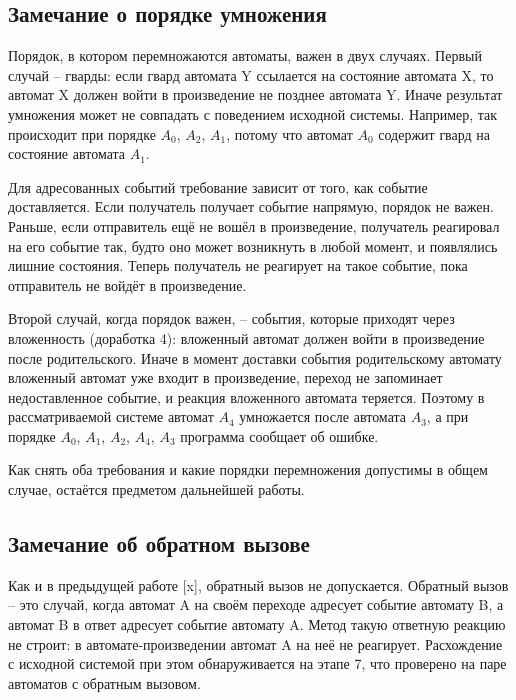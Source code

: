 \documentclass[12pt]{article}
\begin{document}
\subsection*{Замечание о порядке умножения}

Порядок, в котором перемножаются автоматы, важен в двух случаях. Первый случай – гварды: если гвард автомата Y ссылается на состояние автомата X, то автомат X должен войти в произведение не позднее автомата Y. Иначе результат умножения может не совпадать с поведением исходной системы. Например, так происходит при порядке $A_{0}$, $A_{2}$, $A_{1}$, потому что автомат $A_{0}$ содержит гвард на состояние автомата $A_{1}$.

Для адресованных событий требование зависит от того, как событие доставляется. Если получатель получает событие напрямую, порядок не важен. Раньше, если отправитель ещё не вошёл в произведение, получатель реагировал на его событие так, будто оно может возникнуть в любой момент, и появлялись лишние состояния. Теперь получатель не реагирует на такое событие, пока отправитель не войдёт в произведение.

Второй случай, когда порядок важен, – события, которые приходят через вложенность (доработка 4): вложенный автомат должен войти в произведение после родительского. Иначе в момент доставки события родительскому автомату вложенный автомат уже входит в произведение, переход не запоминает недоставленное событие, и реакция вложенного автомата теряется. Поэтому в рассматриваемой системе автомат $A_{4}$ умножается после автомата $A_{3}$, а при порядке $A_{0}$, $A_{1}$, $A_{2}$, $A_{4}$, $A_{3}$ программа сообщает об ошибке.

Как снять оба требования и какие порядки перемножения допустимы в общем случае, остаётся предметом дальнейшей работы.

\subsection*{Замечание об обратном вызове}

Как и в предыдущей работе [x], обратный вызов не допускается. Обратный вызов – это случай, когда автомат A на своём переходе адресует событие автомату B, а автомат B в ответ адресует событие автомату A. Метод такую ответную реакцию не строит: в автомате-произведении автомат A на неё не реагирует. Расхождение с исходной системой при этом обнаруживается на этапе 7, что проверено на паре автоматов с обратным вызовом.
\end{document}
